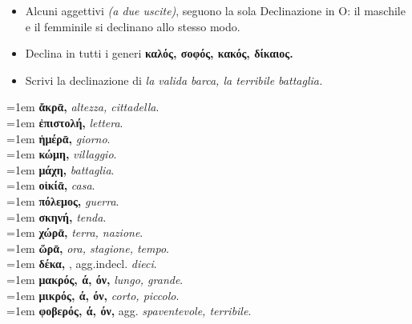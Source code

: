 \documentclass[nols]{tufte-handout}
\newcommand{\textls}[2][5]{%
    \begingroup\addfontfeatures{LetterSpace=#1}#2\endgroup
  }
\renewcommand{\smallcapsspacing}[1]{\textls[10]{#1}}
\renewcommand{\textsc}[1]{\smallcapsspacing{\textsmallcaps{#1}}}
\begin{document}
\begin{itemize}
\item[\textsc{1.}] Alcuni aggettivi \textit{(a due uscite)}, seguono la sola Declinazione in O: il maschile e il femminile si declinano allo stesso modo. 
\end{itemize}

\begin{itemize}
\item[\textsc{1.}] Declina in tutti i generi \textbf{καλός, σοφός, κακός, δίκαιος.}
\item[\textsc{2.}] Scrivi la declinazione di \textit{la valida barca, la terribile battaglia.}
\end{itemize}

\newpage


\begin{multicols}{2}
    \noindent \hangindent=1em \textbf{ἄκρᾱ,} \textit{altezza, cittadella}.  \\
    \noindent \hangindent=1em \textbf{ἐπιστολή,} \textit{lettera}.  \\
    \noindent \hangindent=1em \textbf{ἡμέρᾱ,} \textit{giorno}.  \\
    \noindent \hangindent=1em \textbf{κώμη,} \textit{villaggio}.  \\
    \noindent \hangindent=1em \textbf{μάχη,} \textit{battaglia}.  \\
    \noindent \hangindent=1em \textbf{οἰκίᾱ,} \textit{casa}.  \\
    \noindent \hangindent=1em \textbf{πόλεμος,} \textit{guerra}.  \\
    \noindent \hangindent=1em \textbf{σκηνή,} \textit{tenda}.  \\
	
    \noindent \hangindent=1em \textbf{χώρᾱ,} \textit{terra, nazione}.  \\
    \noindent \hangindent=1em \textbf{ὥρᾱ,} \textit{ora, stagione, tempo}.  \\
	
	\noindent \hangindent=1em \textbf{δέκα,} , agg.indecl. \textit{dieci}. \\ 
	
	
    \noindent \hangindent=1em \textbf{μακρός, ά, όν,} \textit{lungo, grande}.  \\
	\noindent \hangindent=1em \textbf{μικρός, ά, όν,} \textit{corto, piccolo}.  \\
	\noindent \hangindent=1em \textbf{φοβερός, ά, όν,} agg. \textit{spaventevole, terribile}.  \\
\end{multicols}
\end{document}
